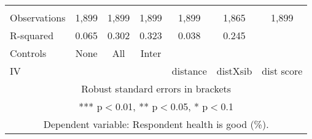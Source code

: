 \begin{tabular}{lcccccc}
 &  &  &  &  &  &  \\
Observations & 1,899 & 1,899 & 1,899 & 1,899 & 1,865 & 1,899 \\
R-squared & 0.065 & 0.302 & 0.323 & 0.038 & 0.245 &  \\
Controls & None & All & Inter &  &  &  \\
 IV &  &  &  & distance & distXsib & dist score \\ \hline
\multicolumn{7}{c}{ Robust standard errors in brackets} \\
\multicolumn{7}{c}{ *** p$<$0.01, ** p$<$0.05, * p$<$0.1} \\
\multicolumn{7}{c}{ Dependent variable: Respondent health is good (\%).} \\
\end{tabular}
